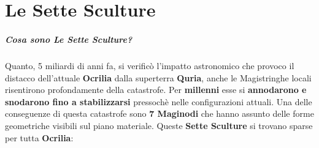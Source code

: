 \documentclass[10pt,twoside,onecolumn,openany]{book}
\begin{document}
\chapter{Le Sette Sculture}
\paragraph{Cosa sono Le Sette Sculture?} Quanto, 5 miliardi di anni fa, si verificò l'impatto astronomico che provoco il distacco dell'attuale \textbf{Ocrilia} dalla superterra \textbf{Quria}, anche le Magistringhe locali risentirono profondamente della catastrofe. Per \textbf{millenni} esse si \textbf{annodarono e snodarono fino a stabilizzarsi} pressochè nelle configurazioni attuali. Una delle conseguenze di questa catastrofe sono \textbf{7 Maginodi} che hanno assunto delle forme geometriche visibili sul piano materiale. Queste \textbf{Sette Sculture} si trovano sparse per tutta \textbf{Ocrilia}:
\end{document}
